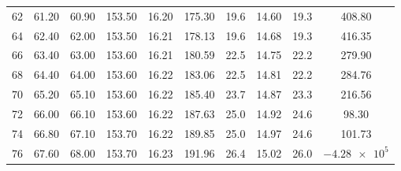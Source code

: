 \begin{table}[H]
\begin{adjustbox}{width=1.2\textwidth, center}
\begin{tabular}{S S[table-format=3.2] S[table-format=3.2] S[table-format=3.2] S[table-format=2.2] S[table-format=3.2] S[table-format=2.1] S[table-format=2.2] S[table-format=3.2] S[table-format=4.2]}
			62                 & 61.20               & 60.90               & 153.50                   & 16.20            & 175.30             & 19.6                             & 14.60                                & 19.3                             & 408.80                      \\
			64                 & 62.40               & 62.00               & 153.50                   & 16.21            & 178.13             & 19.6                             & 14.68                                & 19.3                             & 416.35                      \\
			66                 & 63.40               & 63.00               & 153.60                   & 16.21            & 180.59             & 22.5                             & 14.75                                & 22.2                             & 279.90                      \\
			68                 & 64.40               & 64.00               & 153.60                   & 16.22            & 183.06             & 22.5                             & 14.81                                & 22.2                             & 284.76                      \\
			70                 & 65.20               & 65.10               & 153.60                   & 16.22            & 185.40             & 23.7                             & 14.87                                & 23.3                             & 216.56                      \\
			72                 & 66.00               & 66.10               & 153.60                   & 16.22            & 187.63             & 25.0                             & 14.92                                & 24.6                             & 98.30                       \\
			74                 & 66.80               & 67.10               & 153.70                   & 16.22            & 189.85             & 25.0                             & 14.97                                & 24.6                             & 101.73                      \\
			76                 & 67.60               & 68.00               & 153.70                   & 16.23            & 191.96             & 26.4                             & 15.02                                & 26.0                             & {$\num{-4.28e5}$}           \\
			\bottomrule
		\end{tabular}
	\end{adjustbox}
\end{table}

